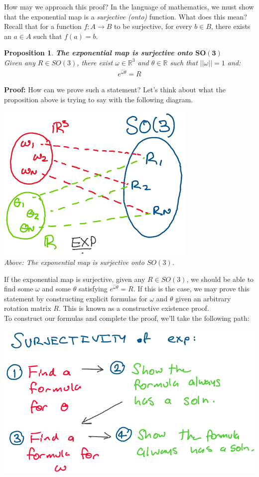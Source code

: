\documentclass[oneside]{book}
\newtheorem{proposition}{Proposition}
\newenvironment{prop} %
  {\colorlet{shadecolor}{blue!9}\begin{shaded}\begin{proposition}}
  {\end{proposition}\end{shaded}}
\begin{document}
How may we approach this proof? In the language of mathematics, we must show that the exponential map is a \textit{surjective (onto)} function. What does this mean? Recall that for a function $f: A \to B$ to be surjective, for every $b \in B$, there exists an $a \in A$ such that $f(a) = b$.
\begin{prop}
\textbf{The exponential map is surjective onto $\mathbf{SO(3)}$}\\
Given any $R \in SO(3)$, there exist $\omega \in \mathbb{R}^3$ and $\theta \in \mathbb{R}$ such that $||\omega|| = 1$ and:
\begin{align}
    e^{\hat\omega\theta} = R
\end{align}
\end{prop}
\noindent\textbf{Proof:} How can we prove such a statement? Let's think about what the proposition above is trying to say with the following diagram.
\begin{center}
   \includegraphics[scale=0.5]{images/surjective.png}\\
   \textit{Above: The exponential map is surjective onto $SO(3)$.}
\end{center}
If the exponential map is surjective, given any $R\in SO(3)$, we should be able to find some $\omega$ and some $\theta$ satisfying $e^{\hat\omega\theta} = R$. If this is the case, we may prove this statement by constructing explicit formulas for $\omega$ and $\theta$ given an arbitrary rotation matrix $R$. This is known as a constructive existence proof.\\
To construct our formulas and complete the proof, we'll take the following path:
\begin{center}
\includegraphics[scale=0.3]{images/roadmap_pf.png}
\end{center}
\end{document}
